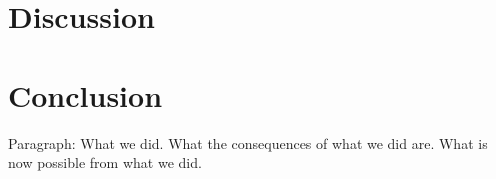 \section{Discussion}




\section{Conclusion}

Paragraph: What we did. What the consequences of what we did are. What is now possible from what we did.